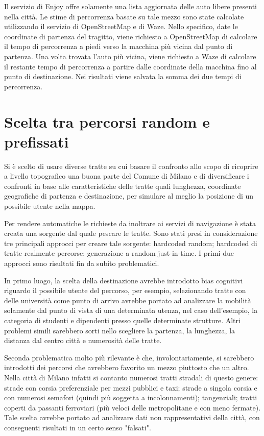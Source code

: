 Il servizio di Enjoy offre solamente una lista aggiornata delle auto libere presenti nella città. Le stime di percorrenza basate su tale mezzo sono state calcolate utilizzando il servizio di OpenStreetMap e di Waze. Nello specifico, date le coordinate di partenza del tragitto, viene richiesto a OpenStreetMap di calcolare il tempo di percorrenza a piedi verso la macchina più vicina dal punto di partenza. Una volta trovata l'auto più vicina, viene richiesto a Waze di calcolare il restante tempo di percorrenza a partire dalle coordinate della macchina fino al punto di destinazione. Nei risultati viene salvata la somma dei due tempi di percorrenza.


\section{Scelta tra percorsi random e prefissati}

Si è scelto di usare diverse tratte su cui basare il confronto allo scopo di ricoprire a livello topografico una buona parte del Comune di Milano e di diversificare i confronti in base alle caratteristiche delle tratte quali lunghezza, coordinate geografiche di partenza e destinazione, per simulare al meglio la posizione di un possibile utente nella mappa.

Per rendere automatiche le richieste da inoltrare ai servizi di navigazione è stata creata una sorgente dal quale pescare le tratte. Sono stati presi in considerazione tre principali approcci per creare tale sorgente: hardcoded random; hardcoded di tratte realmente percorse; generazione a random just-in-time. I primi due approcci sono risultati fin da subito problematici.

In primo luogo, la scelta della destinazione avrebbe introdotto bias cognitivi riguardo il possibile utente del percorso, per esempio, selezionando tratte con delle università come punto di arrivo avrebbe portato ad analizzare la mobilità solamente dal punto di vista di una determinata utenza, nel caso dell'esempio, la categoria di studenti e dipendenti presso quelle determinate strutture. Altri problemi simili sarebbero sorti nello scegliere la partenza, la lunghezza, la distanza dal centro città e numerosità delle tratte.

Seconda problematica molto più rilevante è che, involontariamente, si sarebbero introdotti dei percorsi che avrebbero favorito un mezzo piuttosto che un altro. Nella città di Milano infatti si contanto numerosi tratti stradali di questo genere: strade con corsia preferenziale per mezzi pubblici e taxi; strade a singola corsia e con numerosi semafori (quindi più soggetta a incolonnamenti); tangenziali; tratti coperti da passanti ferroviari (più veloci delle metropolitane e con meno fermate). Tale scelta avrebbe portato ad analizzare dati non rappresentativi della città, con conseguenti risultati in un certo senso "falsati".

